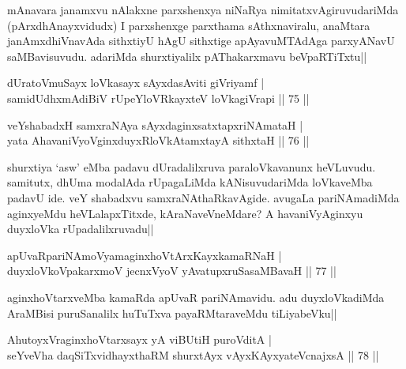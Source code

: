 \begin{artha}
mAnavara janamxvu nAlakxne parxshenxya niNaRya nimitatxvAgiruvudariMda 
(pArxdhAnayxvidudx) I parxshenxge parxthama sAthxnaviralu, anaMtara 
janAmxdhiVnavAda sithxtiyU hAgU sithxtige apAyavuMTAdAga parxyANavU 
saMBavisuvudu. adariMda shurxtiyalilx pAThakarxmavu beVpaRTiTxtu||
\end{artha}


\begin{shl}
dUratoV\s muSayx loVkasayx sAyxdasAviti giVriyamf | \\
samidUdhxmAdiBiV rUpeYloVRkayxteV loVkagiVrapi \hfill|| 75 || 
\end{shl}

\begin{shl}
veYshabadxH samxraNAya sAyxdaginxsatxtapxriNAmataH | \\
yata AhavaniVyoV\s ginxduyxRloVkAtamxtayA sithxtaH \hfill|| 76 || 
\end{shl}

\begin{artha}
shurxtiya `asw' eMba padavu dUradalilxruva paraloVkavanunx heVLuvudu. 
samitutx, dhUma modalAda rUpagaLiMda kANisuvudariMda loVkaveMba padavU 
ide. veY shabadxvu samxraNAthaRkavAgide. avugaLa pariNAmadiMda 
aginxyeMdu heVLalapxTitxde, kAraNaveVneMdare? A havaniVyAginxyu 
duyxloVka rUpadalilxruvadu||
\end{artha}


\begin{shl}
apUvaRpariNAmoV\s yamaginxhoVtArxKayxkamaRNaH | \\
duyxloVkoVpakarxmoV jecnxVyoV yAvatupxruSasaMBavaH \hfill|| 77 || 
\end{shl}

\begin{artha}
aginxhoVtarxveMba kamaRda apUvaR pariNAmavidu. adu duyxloVkadiMda 
AraMBisi puruSanalilx huTuTxva payaRMtaraveMdu tiLiyabeVku||
\end{artha}


\begin{shl}
AhutoyxVraginxhoVtarxsayx yA viBUtiH puroVditA | \\
seYveVha daqSiTxvidhayxthaRM shurxtAyx vAyxKAyxyateV\s cnajxsA \hfill|| 78 || 
\end{shl}

